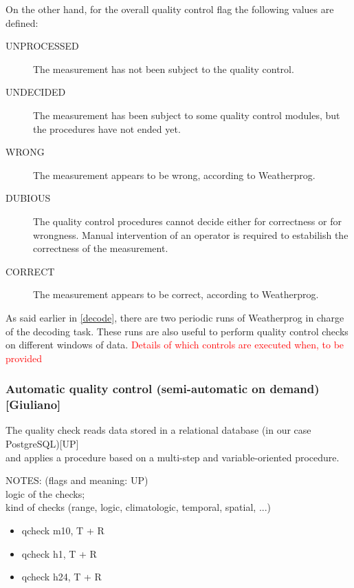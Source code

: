 \documentclass[authoryear,preprint,review,12pt]{elsarticle}
\begin{document}
On the other hand, for the overall quality control flag the following values are defined:
\begin{description}
	\item[UNPROCESSED] The measurement has not been subject to the quality control.
	\item[UNDECIDED] The measurement has been subject to some quality control modules, but the procedures have not ended yet.
	\item[WRONG] The measurement appears to be wrong, according to Weatherprog.
	\item[DUBIOUS] The quality control procedures cannot decide either for correctness or for wrongness. Manual intervention of an operator is required to estabilish the correctness of the measurement.
	\item[CORRECT] The measurement appears to be correct, according to Weatherprog.
\end{description} 

As said earlier in \cref{decode}, there are two periodic runs of Weatherprog in charge of the decoding task. These runs are also useful to perform quality control checks on different windows of data. \textcolor{red}{Details of which controls are executed when, to be provided}

\subsubsection{Automatic quality control (semi-automatic on demand) [Giuliano]}
The quality check reads data stored in a relational database (in our case PostgreSQL)[UP]\\
and applies a procedure based on a multi-step and variable-oriented procedure.

NOTES: (flags and meaning: UP)\\
logic of the checks;\\
kind of checks (range, logic, climatologic, temporal, spatial, ...)

\begin{itemize}
    \item qcheck m10, T + R
    \item qcheck h1,  T + R
    \item qcheck h24, T + R
\end{itemize}
\end{document}
